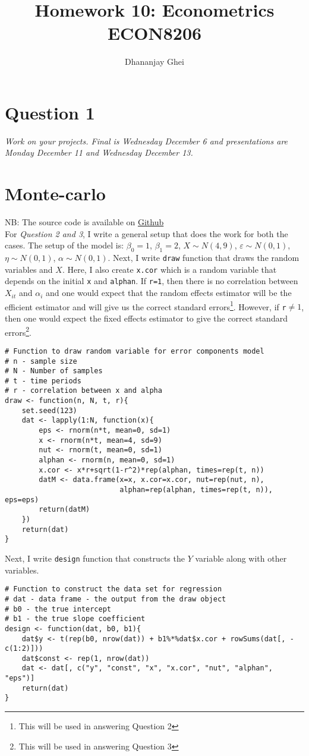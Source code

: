 \documentclass{article}
\title{Homework 10: Econometrics\\
  ECON8206}
\author{Dhananjay Ghei}
\begin{document}
\maketitle
\section*{Question 1}
\textit{Work on your projects. Final is Wednesday December 6 and
presentations are Monday December 11 and Wednesday December 13.}

\section*{Monte-carlo}
NB: The source code is available on \href{https://www.github.com/dhananjayghei/econometrics/}{Github}\\
For \textit{Question 2 and 3}, I write a general setup that does the
work for both the cases. The setup of the model is:
$\beta_0=1$, $\beta_1=2$, $X \sim N(4, 9)$, $\varepsilon \sim N(0, 1)$,
$\eta \sim N(0, 1)$, $\alpha \sim N(0, 1)$. Next, I write
\texttt{draw} function that draws the random variables and $X$. Here,
I also create \texttt{x.cor} which is a random variable that depends
on the initial \texttt{x} and \texttt{alphan}. If \texttt{r=1}, then
there is no correlation between $X_{it}$ and $\alpha_i$ and one would
expect that the random effects estimator will be the efficient
estimator and will give us the correct standard errors\footnote{This
  will be used in answering Question 2}. However, if
\texttt{r}$\neq 1$, then one would expect the fixed effects estimator
to give the correct standard errors\footnote{This will be used in
  answering Question 3}. 
\begin{verbatim}
# Function to draw random variable for error components model
# n - sample size
# N - Number of samples
# t - time periods 
# r - correlation between x and alpha
draw <- function(n, N, t, r){
    set.seed(123)
    dat <- lapply(1:N, function(x){
        eps <- rnorm(n*t, mean=0, sd=1)
        x <- rnorm(n*t, mean=4, sd=9)
        nut <- rnorm(t, mean=0, sd=1)
        alphan <- rnorm(n, mean=0, sd=1)
        x.cor <- x*r+sqrt(1-r^2)*rep(alphan, times=rep(t, n))
        datM <- data.frame(x=x, x.cor=x.cor, nut=rep(nut, n),
                           alphan=rep(alphan, times=rep(t, n)), eps=eps)
        return(datM)
    })
    return(dat)
}
\end{verbatim}
Next, I write \texttt{design} function that constructs the $Y$
variable along with other variables.
\begin{verbatim}
# Function to construct the data set for regression
# dat - data frame - the output from the draw object
# b0 - the true intercept 
# b1 - the true slope coefficient
design <- function(dat, b0, b1){
    dat$y <- t(rep(b0, nrow(dat)) + b1%*%dat$x.cor + rowSums(dat[, -c(1:2)]))
    dat$const <- rep(1, nrow(dat))
    dat <- dat[, c("y", "const", "x", "x.cor", "nut", "alphan", "eps")]
    return(dat)
}
\end{verbatim}
\end{document}
